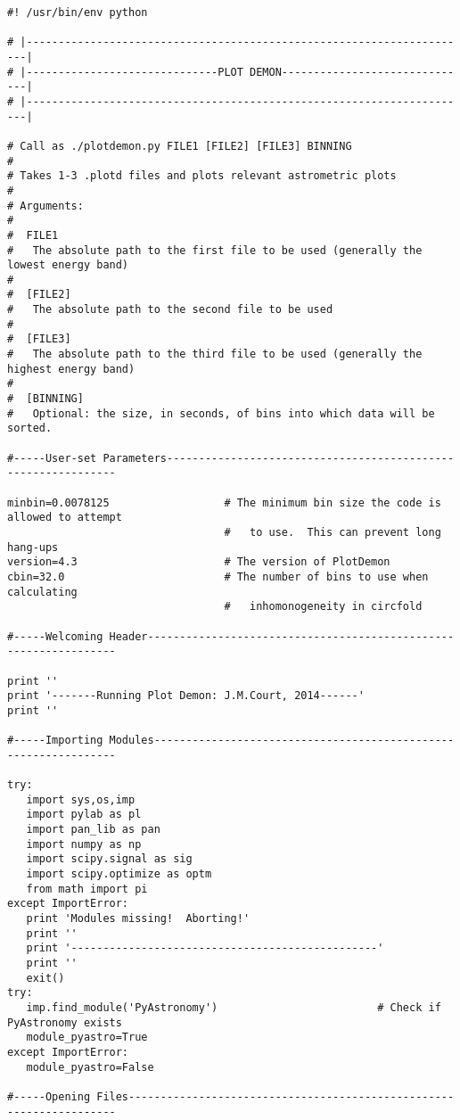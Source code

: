 \begin{verbatim}
#! /usr/bin/env python

# |----------------------------------------------------------------------|
# |------------------------------PLOT DEMON------------------------------|
# |----------------------------------------------------------------------|

# Call as ./plotdemon.py FILE1 [FILE2] [FILE3] BINNING
#
# Takes 1-3 .plotd files and plots relevant astrometric plots
#
# Arguments:
#
#  FILE1
#   The absolute path to the first file to be used (generally the lowest energy band)
#
#  [FILE2]
#   The absolute path to the second file to be used
#
#  [FILE3]
#   The absolute path to the third file to be used (generally the highest energy band)
#
#  [BINNING]
#   Optional: the size, in seconds, of bins into which data will be sorted.

#-----User-set Parameters--------------------------------------------------------------

minbin=0.0078125                  # The minimum bin size the code is allowed to attempt
                                  #   to use.  This can prevent long hang-ups
version=4.3                       # The version of PlotDemon
cbin=32.0                         # The number of bins to use when calculating
                                  #   inhomonogeneity in circfold

#-----Welcoming Header-----------------------------------------------------------------

print ''
print '-------Running Plot Demon: J.M.Court, 2014------'
print ''

#-----Importing Modules----------------------------------------------------------------

try:
   import sys,os,imp
   import pylab as pl
   import pan_lib as pan
   import numpy as np
   import scipy.signal as sig
   import scipy.optimize as optm
   from math import pi
except ImportError:
   print 'Modules missing!  Aborting!'
   print ''
   print '------------------------------------------------'
   print ''
   exit()
try:
   imp.find_module('PyAstronomy')                         # Check if PyAstronomy exists
   module_pyastro=True
except ImportError:
   module_pyastro=False

#-----Opening Files--------------------------------------------------------------------


\end{verbatim}
